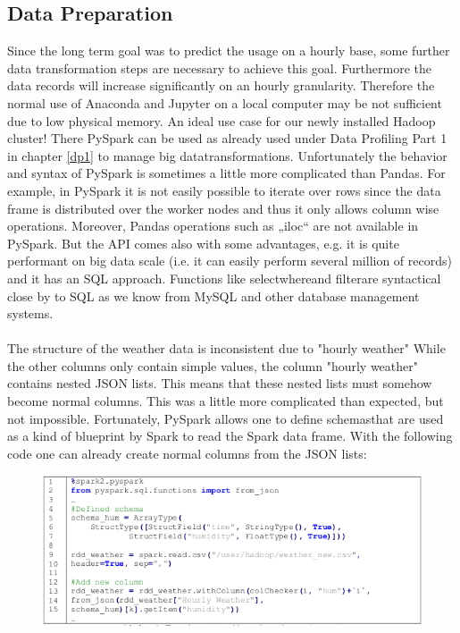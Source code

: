 \subsection{Data Preparation}
Since the long term goal was to predict the usage on a hourly base, some further data
transformation steps are necessary to achieve this goal. Furthermore the data records will
increase significantly on an hourly granularity. Therefore the normal use of Anaconda and Jupyter
on a local computer may be not sufficient due to low physical memory. An ideal use case for our
newly installed Hadoop cluster! There PySpark can be used as already used under Data Profiling
Part 1 in chapter \ref{dp1} to manage \glqq big data\grqq transformations. Unfortunately the behavior and syntax of PySpark
is sometimes a little more complicated than Pandas. For example, in PySpark it is not easily
possible to iterate over rows since the data frame is distributed over the worker nodes and thus it
only allows column wise operations. Moreover, Pandas operations such as „iloc“ are not available
in PySpark. But the API comes also with some advantages, e.g. it is quite performant on big data
scale (i.e. it can easily perform several million of records) and it has an SQL approach.
Functions like \glqq select\grqq \glqq where\grqq and \glqq filter\grqq are syntactical close by to SQL as we know from MySQL
and other database management systems.\\\\
The structure of the weather data is inconsistent due to "hourly weather"  While the other columns
only contain simple values, the column "hourly weather" contains nested JSON lists. This means
that these nested lists must somehow become normal columns. This was a little more complicated
than expected, but not impossible. Fortunately, PySpark allows one to define \glqq schemas\grqq that are
used as a kind of blueprint by Spark to read the Spark data frame. With the following code one
can already create normal columns from the JSON lists:
\begin{figure}[H]
\hspace{-1.6cm}
\includegraphics[width=1.2\textwidth]{img/listing5}\label{fig:listing5}
\label{fig:listing5}
\end{figure}
